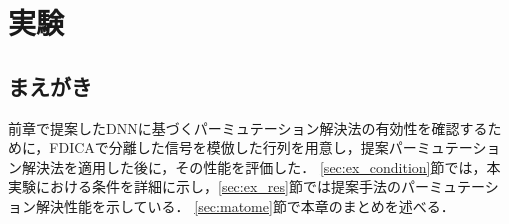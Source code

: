 \chapter{実験}
\label{chap:ex}

\section{まえがき}
前章で提案したDNNに基づくパーミュテーション解決法の有効性を確認するために，FDICAで分離した信号を模倣した行列を用意し，提案パーミュテーション解決法を適用した後に，その性能を評価した．
\ref{sec:ex_condition}節では，本実験における条件を詳細に示し，\ref{sec:ex_res}節では提案手法のパーミュテーション解決性能を示している．
\ref{sec:matome}節で本章のまとめを述べる．
